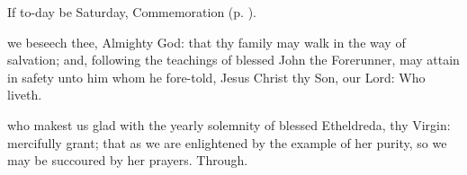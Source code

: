 \begin{rubric}
	If to-day be Saturday, Commemoration  (p. \pageref{JohnBaptistVigilCollect}).
\end{rubric}



\vigilCollect\label{JohnBaptistVigilCollect}
 we beseech thee, Almighty God: that thy family may walk in the way of salvation; and, following the teachings of blessed John the Forerunner, may attain in safety unto him whom he fore-told, Jesus Christ thy Son, our Lord: Who liveth.



\memorialCollect
{} who makest us glad with the yearly solemnity of blessed Etheldreda, thy Virgin: mercifully grant; that as we are enlightened by the example of her purity, so we may be succoured by her prayers. Through.


\clearpage
{}\label{StJohnBaptist}


